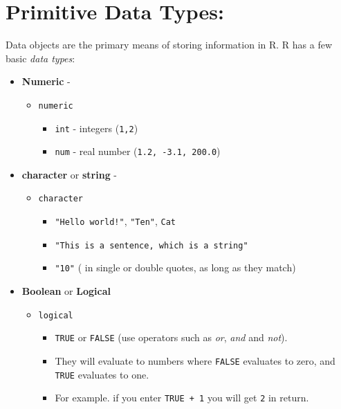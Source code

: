 \documentclass[
]{book}
\providecommand{\tightlist}{%
  \setlength{\itemsep}{0pt}\setlength{\parskip}{0pt}}
\begin{document}
\hypertarget{primitive-data-types}{%
\section{Primitive Data Types:}\label{primitive-data-types}}

Data objects are the primary means of storing information in R.
R has a few basic \emph{data types}:

\begin{itemize}
\item
  \textbf{Numeric} -

  \begin{itemize}
  \tightlist
  \item
    \texttt{numeric}

    \begin{itemize}
    \tightlist
    \item
      \texttt{int} - integers (\texttt{1,2})
    \item
      \texttt{num} - real number (\texttt{1.2,\ -3.1,\ 200.0})
    \end{itemize}
  \end{itemize}
\item
  \textbf{character} or \textbf{string} -

  \begin{itemize}
  \tightlist
  \item
    \texttt{character}

    \begin{itemize}
    \tightlist
    \item
      \texttt{"Hello\ world!"}, \texttt{"Ten"}, \texttt{\textquotesingle{}Cat\textquotesingle{}}
    \item
      \texttt{"This\ is\ a\ sentence,\ which\ is\ a\ string"}
    \item
      \texttt{"10"} ( in single or double quotes, as long as they match)
    \end{itemize}
  \end{itemize}
\item
  \textbf{Boolean} or \textbf{Logical}

  \begin{itemize}
  \tightlist
  \item
    \texttt{logical}

    \begin{itemize}
    \tightlist
    \item
      \texttt{TRUE} or \texttt{FALSE} (use operators such as \emph{or}, \emph{and} and \emph{not}).
    \item
      They will evaluate to numbers where \texttt{FALSE} evaluates to zero, and \texttt{TRUE} evaluates to one.
    \item
      For example. if you enter \texttt{TRUE\ +\ 1} you will get \texttt{2} in return.
    \end{itemize}
  \end{itemize}
\end{itemize}
\end{document}
